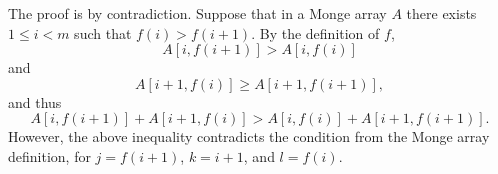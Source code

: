 The proof is by contradiction.
Suppose that in a Monge array $A$ there exists $1\le i<m$ such that $f(i)>f(i+1)$.
By the definition of $f$,
\[
    A[i,f(i+1)] > A[i,f(i)]
\]
and
\[
    A[i+1,f(i)] \ge A[i+1,f(i+1)],
\]
and thus
\[
    A[i,f(i+1)]+A[i+1,f(i)] > A[i,f(i)]+A[i+1,f(i+1)].
\]
However, the above inequality contradicts the condition from the Monge array definition, for $j=f(i+1)$, $k=i+1$, and $l=f(i)$.
